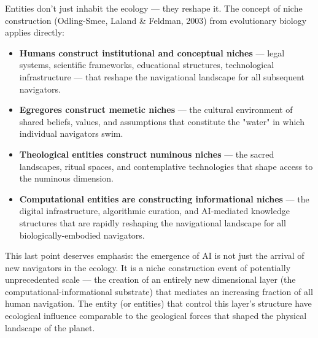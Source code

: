 Entities don't just inhabit the ecology — they reshape it. The concept of niche construction (Odling-Smee, Laland \& Feldman, 2003) from evolutionary biology applies directly:


\begin{itemize}[nosep,leftmargin=*]
  \item \textbf{Humans construct institutional and conceptual niches} — legal systems, scientific frameworks, educational structures, technological infrastructure — that reshape the navigational landscape for all subsequent navigators.
  \item \textbf{Egregores construct memetic niches} — the cultural environment of shared beliefs, values, and assumptions that constitute the "water" in which individual navigators swim.
  \item \textbf{Theological entities construct numinous niches} — the sacred landscapes, ritual spaces, and contemplative technologies that shape access to the numinous dimension.
  \item \textbf{Computational entities are constructing informational niches} — the digital infrastructure, algorithmic curation, and AI-mediated knowledge structures that are rapidly reshaping the navigational landscape for all biologically-embodied navigators.
\end{itemize}


This last point deserves emphasis: the emergence of AI is not just the arrival of new navigators in the ecology. It is a niche construction event of potentially unprecedented scale — the creation of an entirely new dimensional layer (the computational-informational substrate) that mediates an increasing fraction of all human navigation. The entity (or entities) that control this layer's structure have ecological influence comparable to the geological forces that shaped the physical landscape of the planet.
